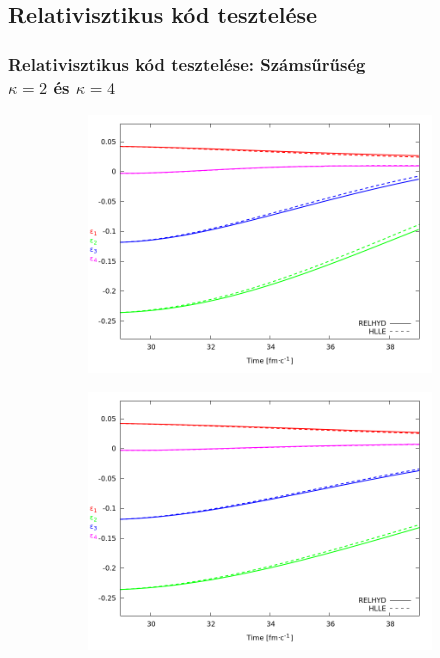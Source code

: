 \documentclass{beamer}
\begin{document}
\subsection{Relativisztikus kód tesztelése}
\begin{frame}[noframenumbering]
\frametitle{Relativisztikus kód tesztelése: Számsűrűség \\ $\kappa=2$ és $\kappa=4$}
\begin{center}
\begin{figure}[H]
	\centering
    \begin{subfigure}[b]{0.49\textwidth}
    		\includegraphics[width=\textwidth]{pic/res/hr_n_kappa=2}
	\end{subfigure}
	\begin{subfigure}[b]{0.49\textwidth}
        	\includegraphics[width=\textwidth]{pic/res/hr_n_kappa=4}
	\end{subfigure}
\end{figure}
\end{center}
\end{frame}
\end{document}
